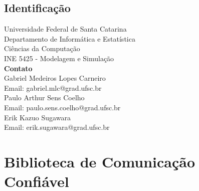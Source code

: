 \documentclass[
	12pt,				%
	openright,			%
	oneside,			%
	a4paper,			%
	english,			%
	french,				%
	spanish,			%
	brazil				%
	]{abntex2}
\begin{document}

\tableofcontents*
\cleardoublepage



\textual

\chapter*[Introdução]{Identificação}

\begin{center}
	Universidade Federal de Santa Catarina \\
	Departamento de Informática e Estatística\\
	Ciências da Computação \\
	INE 5425 - Modelagem e Simulação \\
	\vspace*{5cm}
	\textbf{Contato} \\
	\vspace*{1cm}
    Gabriel Medeiros Lopes Carneiro\\
	Email: gabriel.mlc@grad.ufsc.br\\
	\vspace*{0.5cm}
    Paulo Arthur Sens Coelho\\
	Email: paulo.sens.coelho@grad.ufsc.br\\
	\vspace*{0.5cm}
	Erik Kazuo Sugawara \\
	Email: erik.sugawara@grad.ufsc.br \\
\end{center}
\part{Biblioteca de Comunicação Confiável}


\end{document}
